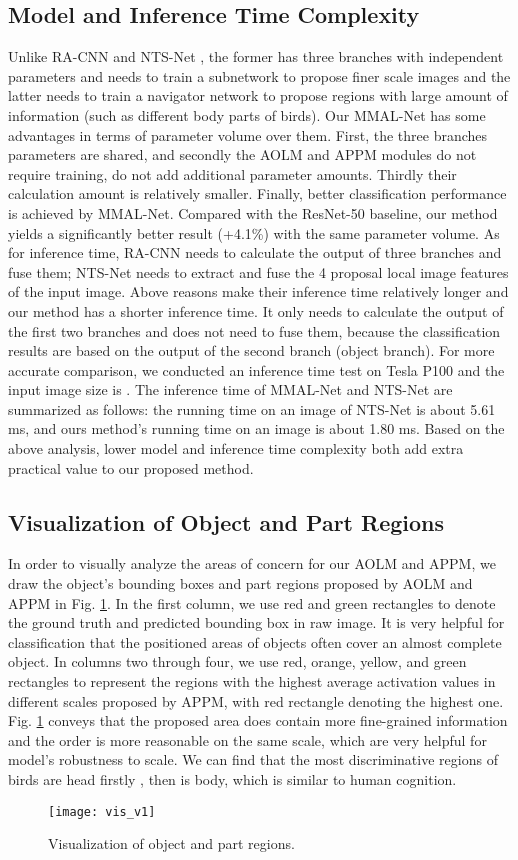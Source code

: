 \documentclass[runningheads]{llncs}
\begin{document}
\subsection{Model and Inference Time Complexity}
Unlike RA-CNN \cite{fu2017look} and NTS-Net \cite{yang2018learning}, the former has three branches with independent parameters and needs to train a subnetwork to propose finer scale images and the latter needs to train a navigator network to propose regions with large amount of information (such as different body parts of birds). Our MMAL-Net has some advantages in terms of parameter volume over them. First, the three branches parameters are shared, and secondly the AOLM and APPM modules do not require training, do not add additional parameter amounts. Thirdly their calculation amount is relatively smaller. Finally, better classification performance is achieved by MMAL-Net. Compared with the ResNet-50 baseline, our method yields a significantly better result (+4.1\%) with the same parameter volume. As for inference time, RA-CNN needs to calculate the output of three branches and fuse them; NTS-Net needs to extract and fuse the 4 proposal local image features of the input image. Above reasons make their inference time relatively longer and our method has a shorter inference time. It only needs to calculate the output of the first two branches and does not need to fuse them, because the classification results are based on the output of the second branch (object branch). For more accurate comparison, we conducted an inference time test on Tesla P100 and the input image size is  . The inference time of MMAL-Net and NTS-Net  are summarized as follows: the running time on an image of NTS-Net is about 5.61 ms, and ours method’s running time on an image is about 1.80 ms. Based on the above analysis, lower model and inference time complexity both add extra practical value to our proposed method.
\subsection{Visualization of Object and Part Regions}
In order to visually analyze the areas of concern for our AOLM and APPM, we draw the object's bounding boxes and part regions proposed by AOLM and APPM in Fig. \ref {fg4}. In the first column, we use red and green rectangles to denote the ground truth and predicted bounding box in raw image. It is very helpful for classification that the positioned areas of objects often cover an almost complete object. In columns two through four, we use red, orange, yellow, and green rectangles to represent the regions with the highest average activation values in different scales proposed by APPM, with red rectangle denoting the highest one.  Fig. \ref {fg4} conveys that the proposed area does contain more fine-grained information and the order is more reasonable on the same scale, which are very helpful for model's robustness to scale. We can find that the most discriminative regions of birds are head firstly , then is body, which is similar to human cognition.
\begin{figure}
\centering
\texttt{[image: vis\_v1]}
\caption{Visualization of object and part regions.} \label{fg4}
\end{figure}
\end{document}
